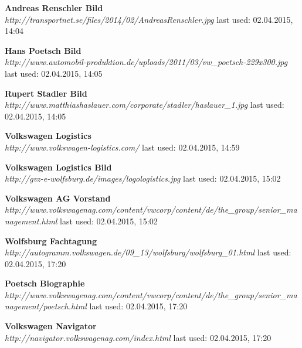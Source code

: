 \documentclass[12pt]{article}
\begin{document}
\begin{thebibliography}{56}
\textbf{Andreas Renschler Bild} \\
\textit{
	http://transportnet.se/files/2014/02/AndreasRenschler.jpg
}
\newline last used: 02.04.2015, 14:04

\textbf{Hans Poetsch Bild} \\
\textit{
	http://www.automobil-produktion.de/uploads/2011/03/vw\_poetsch-229x300.jpg
}
\newline last used: 02.04.2015, 14:05

\textbf{Rupert Stadler Bild} \\
\textit{
	http://www.matthiashaslauer.com/corporate/stadler/haslauer\_1.jpg
}
\newline last used: 02.04.2015, 14:05

\textbf{Volkswagen Logistics} \\
\textit{
	http://www.volkswagen-logistics.com/
}
\newline last used: 02.04.2015, 14:59

\textbf{Volkswagen Logistics Bild} \\
\textit{
	http://gvz-e-wolfsburg.de/images/logologistics.jpg
}
\newline last used: 02.04.2015, 15:02

\textbf{Volkswagen AG Vorstand} \\
\textit{
	http://www.volkswagenag.com/content/vwcorp/content/de/the\_group/senior\_management.html
}
\newline last used: 02.04.2015, 15:02

\textbf{Wolfsburg Fachtagung} \\
\textit{
	http://autogramm.volkswagen.de/09\_13/wolfsburg/wolfsburg\_01.html
}
\newline last used: 02.04.2015, 17:20

\textbf{Poetsch Biographie} \\
\textit{
	http://www.volkswagenag.com/content/vwcorp/content/de/the\_group/senior\_management/poetsch.html
}
\newline last used: 02.04.2015, 17:20

\textbf{Volkswagen Navigator} \\
\textit{
	http://navigator.volkswagenag.com/index.html
}
\newline last used: 02.04.2015, 17:20


\end{thebibliography}
\end{document}
